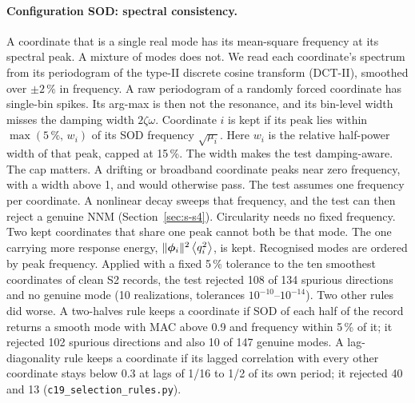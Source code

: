 \documentclass[11pt]{article}
\begin{document}
\paragraph{Configuration SOD: spectral consistency.} A coordinate that is a single real mode has its mean-square frequency at its spectral peak. A mixture of modes does not. We read each coordinate's spectrum from its periodogram of the type-II discrete cosine transform (DCT-II), smoothed over $\pm2\,\%$ in frequency. A raw periodogram of a randomly forced coordinate has single-bin spikes. Its arg-max is then not the resonance, and its bin-level width misses the damping width $2\zeta\omega$. Coordinate $i$ is kept if its peak lies within $\max(5\,\%,\,w_i)$ of its SOD frequency $\sqrt{\mu_i}$. Here $w_i$ is the relative half-power width of that peak, capped at 15\,\%. The width makes the test damping-aware. The cap matters. A drifting or broadband coordinate peaks near zero frequency, with a width above 1, and would otherwise pass. The test assumes one frequency per coordinate. A nonlinear decay sweeps that frequency, and the test can then reject a genuine NNM (Section~\ref{sec:s-s4}). Circularity needs no fixed frequency. Two kept coordinates that share one peak cannot both be that mode. The one carrying more response energy, $\|\bm{\phi}_i\|^2\left\langle q_i^2 \right\rangle$, is kept. Recognised modes are ordered by peak frequency.
Applied with a fixed 5\,\% tolerance to the ten smoothest coordinates of clean S2 records, the test rejected 108 of 134 spurious directions and no genuine mode (10 realizations, tolerances $10^{-10}$--$10^{-14}$). Two other rules did worse. A two-halves rule keeps a coordinate if SOD of each half of the record returns a smooth mode with MAC above 0.9 and frequency within 5\,\% of it; it rejected 102 spurious directions and also 10 of 147 genuine modes. A lag-diagonality rule keeps a coordinate if its lagged correlation with every other coordinate stays below 0.3 at lags of 1/16 to 1/2 of its own period; it rejected 40 and 13 (\texttt{c19\_selection\_rules.py}).
\end{document}
